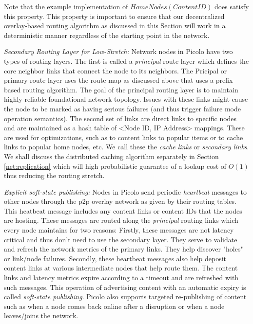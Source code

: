 Note that the example implementation of \(HomeNodes(ContentID)\) does satisfy this property. This property is important
to ensure that our decentralized overlay-based routing algorithm as discussed in this Section will work in a
deterministic manner regardless of the starting point in the network.

{\em Secondary Routing Layer for Low-Stretch:} Network nodes in Picolo have two types of routing layers. The first is
called a {\em principal} route layer which defines the core neighbor links that connect the node to its neighbors. The
Pricipal or primary route layer uses the route map as discussed above that uses a prefix-based routing algorithm. The
goal of the principal routing layer is to maintain highly reliable foundational network topology. Issues with these
links might cause the node to be marked as having serious failures (and thus trigger failure mode operation semantics).
The second set of links are direct links to specific nodes and are maintained as a hash table of <Node ID, IP Address>
mappings. These are used for optimizations, such as to content links to popular items or to cache links to popular home
nodes, etc. We call these the {\em cache links} or {\em secondary links}. We shall discuss the distributed caching
algorithm separately in Section \ref{net:replication} which will high probabilistic guarantee of a lookup cost of
\(O(1)\) thus reducing the routing stretch.

{\em Explicit soft-state publishing:} Nodes in Picolo send periodic {\em heartbeat} messages to other nodes through the
p2p overlay network as given by their routing tables. This heatbeat message includes any content links or content IDs
that the nodes are hosting. These messages are routed along the {\em principal} routing links which every node maintains
for two reasons: Firstly, these messages are not latency critical and thus don't need to use the secondary layer. They
serve to validate and refresh the network metrics of the primary links. They help discover "holes" or link/node
failures. Secondly, these heartbeat messages also help deposit content links at various intermediate nodes that help
route them. The content links and latency metrics expire according to a timeout and are refreshed with such messages.
This operation of advertising content with an automatic expiry is called {\em soft-state publishing}. Picolo also
supports targeted re-publishing of content such as when a node comes back online after a disruption or when a node
leaves/joins the network.


